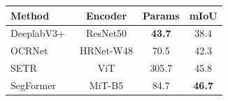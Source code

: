 \begin{tabular}{l c c c}
\toprule
Method     & Encoder  & Params & mIoU \\ \midrule
DeeplabV3+~\cite{deeplabv3+} & ResNet50  & \textbf{43.7}      & 38.4   \\ 
OCRNet~\cite{ocrnet}     & HRNet-W48 & 70.5      & 42.3   \\ 
SETR~\cite{setr}       & ViT       & 305.7     & 45.8   \\ \midrule
SegFormer & MiT-B5   & 84.7      & \textbf{46.7}   \\ 
\bottomrule
\end{tabular}

